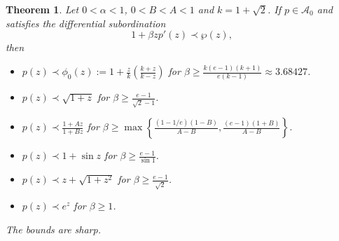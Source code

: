 \documentclass[12pt, reqno]{amsart}
\numberwithin{equation}{section}
\theoremstyle{plain}
\newtheorem{theorem}{Theorem}[section]
\theoremstyle{definition}
\theoremstyle{remark}
\begin{document}
\begin{theorem}
	Let $0<\alpha<1$, $0<B<A<1$ and $k=1+\sqrt{2}$. If $p\in \mathcal{A}_{0}$ and satisfies the differential subordination
	\begin{equation*}
	1+\beta zp'(z) \prec \wp(z),  
	\end{equation*}  
	then
	\begin{itemize}
		\item [$(i)$] $p(z) \prec \phi_0(z):=1+\frac{z}{k}\left(\frac{k+z}{k-z}\right)$ for $\beta\geq \frac{k(e-1)(k+1)}{e(k-1)}\approx 3.68427$.
		\item [$(ii)$] $p(z)\prec \sqrt{1+z}$   for $\beta\geq \frac{e-1}{\sqrt{2}-1}$.
		\item [$(iii)$] $p(z)\prec \frac{1+Az}{1+Bz}$   for $\beta\geq \max\left\{\frac{(1-1/e)(1-B)}{A-B}, \frac{(e-1)(1+B)}{A-B}\right\}$.
		\item [$(iv)$] $p(z)\prec 1+\sin{z}$   for $\beta\geq \frac{e-1}{\sin{1}}$.
		\item [$(v)$] $p(z)\prec z+\sqrt{1+z^2}$   for $\beta\geq\frac{e-1}{\sqrt{2}}$.
		\item [$(vi)$] $p(z)\prec e^z$   for $\beta\geq1$.
	\end{itemize}
	The bounds are sharp.
\end{theorem}
\end{document}
